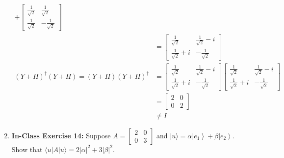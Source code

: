 \documentclass[main.tex]{subfiles}
\begin{document}
\begin{enumerate}
\begin{align*}
                                                    + \left[\begin{array}{cc} \frac{1}{\sqrt{2}} & \frac{1}{\sqrt{2}} \\ \frac{1}{\sqrt{2}} & -\frac{1}{\sqrt{2}} \end{array} \right]\\
                                                    & = \left[\begin{array}{cc} \frac{1}{\sqrt{2}} & \frac{1}{\sqrt{2}} -i \\ \frac{1}{\sqrt{2}} + i & -\frac{1}{\sqrt{2}} \end{array}\right]\\
        (Y+H)^{\dagger}(Y+H) = (Y+H)(Y+H)^{\dagger} & = \left[\begin{array}{cc} \frac{1}{\sqrt{2}} & \frac{1}{\sqrt{2}} -i \\ \frac{1}{\sqrt{2}} + i & -\frac{1}{\sqrt{2}} \end{array}\right]
                                                    \left[\begin{array}{cc} \frac{1}{\sqrt{2}} & \frac{1}{\sqrt{2}} -i \\ \frac{1}{\sqrt{2}} + i & -\frac{1}{\sqrt{2}} \end{array}\right]\\
                                                    & = \left[\begin{array}{cc} 2 & 0 \\ 0 & 2 \end{array}\right]\\
                                                    & \neq I
    \end{align*}

\item[] \textbf{In-Class Exercise 14:} Suppose $A=\left[\begin{array}{ll}2 & 0 \\ 0 & 3\end{array}\right]$ and $|u\rangle=\alpha\left|e_{1}\right\rangle+\beta\left|e_{2}\right\rangle$. Show that $\langle u|A| u\rangle=2|\alpha|^{2}+3|\beta|^{2}$.


\end{enumerate}
\end{document}
